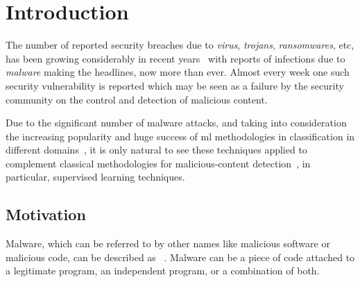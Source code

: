 
\chapter{Introduction}
\label{chapter:introduction}

The number of reported security breaches due to \emph{virus}, \emph{trojans}, \emph{ransomwares}, etc, has been growing considerably in recent years~\cite{av-test:report} with reports of infections due to \emph{malware}  making the headlines, now more than ever.
Almost every week one such security vulnerability is reported which may be seen as a failure by the security community on the control and detection of malicious content. 

Due to the significant number of malware attacks, and taking into consideration the increasing popularity and huge success of \gls{ml} methodologies in classification in different domains~\cite{lee2003learning,joachims2002learning,li2010object,ding2001multi}, it is only natural to see these techniques applied to complement classical methodologies for malicious-content detection~\cite{arp2014drebin,christodorescu:semantics,kolosnjaji2016deep,kolter:learning,miller:rev_int,nissim:al_pdf,perdisci:behavior,rieck:dynamic,santos2013opcode,schultz:data_mining,schwenk2012autonomous,vsrndic2013detection,deo2016prescience,gandotra2014malware,jordaney2017transcend,rossow:practices}, in particular, supervised learning techniques.

\section{Motivation}
\label{section:motivation}

Malware, which can be referred to by other names like malicious software or malicious code, can be described as ~\cite{mcgraw:mal_code}.
Malware can be a piece of code attached to a legitimate program, an independent program, or a combination of both.

